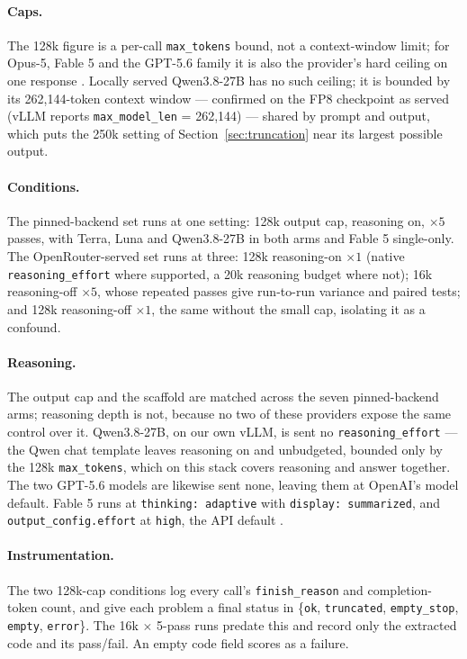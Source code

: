 \documentclass{article}
\begin{document}
\paragraph{Caps.} The 128k figure is a per-call \texttt{max\_tokens} bound, not a context-window
limit; for Opus-5, Fable 5 and the GPT-5.6 family it is also the provider's hard ceiling on one
response \citep{anthropic2026,openai2026}. Locally served Qwen3.8-27B has no such ceiling; it is
bounded by its 262{,}144-token context window \citep{qwen2026c} --- confirmed on the FP8 checkpoint
as served (vLLM reports \texttt{max\_model\_len} = 262{,}144) --- shared by prompt and output,
which puts the 250k setting of Section~\ref{sec:truncation} near its largest possible output.

\paragraph{Conditions.} The pinned-backend set runs at one setting: 128k output cap, reasoning on,
$\times 5$ passes, with Terra, Luna and Qwen3.8-27B in both arms and Fable 5 single-only. The
OpenRouter-served set runs at three: 128k reasoning-on $\times 1$ (native
\texttt{reasoning\_effort} where supported, a 20k reasoning budget where not); 16k reasoning-off
$\times 5$, whose repeated passes give run-to-run variance and paired tests; and 128k reasoning-off
$\times 1$, the same without the small cap, isolating it as a confound.

\paragraph{Reasoning.} The output cap and the scaffold are matched across the seven pinned-backend
arms; reasoning depth is not, because no two of these providers expose the same control over it.
Qwen3.8-27B, on our own vLLM, is sent no \texttt{reasoning\_effort} --- the Qwen chat template
leaves reasoning on and unbudgeted, bounded only by the 128k \texttt{max\_tokens}, which on this
stack covers reasoning and answer together. The two GPT-5.6 models are likewise sent none, leaving
them at OpenAI's model default. Fable 5 runs at \texttt{thinking: adaptive} with \texttt{display:
summarized}, and \texttt{output\_config.effort} at \texttt{high}, the API default
\citep{anthropic2026effort}.

\paragraph{Instrumentation.} The two 128k-cap conditions log every call's \texttt{finish\_reason}
and completion-token count, and give each problem a final status in \{\texttt{ok},
\texttt{truncated}, \texttt{empty\_stop}, \texttt{empty}, \texttt{error}\}. The 16k $\times$ 5-pass
runs predate this and record only the extracted code and its pass/fail. An empty code field scores
as a failure.
\end{document}
